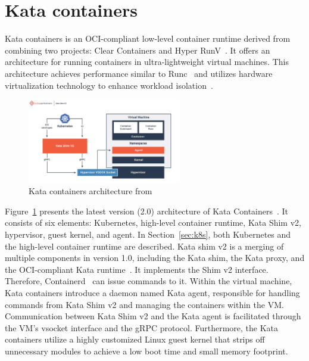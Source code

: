 \section{Kata containers}
\label{sec:Kata}

Kata containers is an OCI-compliant low-level container runtime derived from combining two projects: Clear Containers and Hyper RunV~\cite*{Kata-Containers}. It offers an architecture for running containers in ultra-lightweight virtual machines. This architecture achieves performance similar to Runc~\cite*{runc} and 
utilizes hardware virtualization technology to enhance workload isolation~\cite*{9198653}.
\begin{figure}[htp]
  \centering
  \includegraphics[width=0.6\textwidth]{images/kata.PNG}
  \caption[Kata containers architecture]{Kata containers architecture from~\cite*{Kata-Containers} }
  \label{fig:kata}
\end{figure}
Figure~\ref{fig:kata} presents the latest version (2.0) architecture of Kata Containers~\cite*{Kata_arch}. It consists of six elements: Kubernetes, high-level container runtime, Kata Shim v2, hypervisor, guest kernel, and agent. In Section~\ref{sec:k8s}, both Kubernetes and the high-level container 
runtime are described. Kata shim v2 is a merging of multiple components in version 1.0, including the Kata shim, the Kata proxy, and the OCI-compliant Kata runtime~\cite*{Kata_arch}. It implements the Shim v2 interface. Therefore, Containerd~\cite*{containerd} can issue commands to it. Within the 
virtual machine, Kata containers introduce a daemon named Kata agent, responsible for handling commands from Kata Shim v2 and managing the containers within the VM. Communication between Kata Shim v2 and the Kata agent is facilitated through the VM's vsocket interface and the gRPC protocol. Furthermore, the 
Kata containers utilize a highly customized Linux guest kernel that strips off unnecessary modules to achieve a low boot time and small memory footprint.


